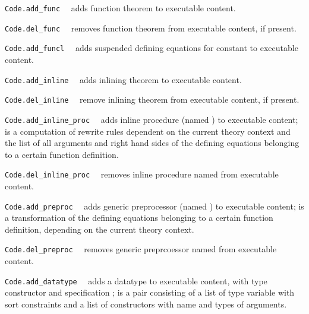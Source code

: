\begin{isabellebody}
\begin{isamarkuptext}
  \begin{description}

  \item \verb|Code.add_func|~~ adds function
     theorem  to executable content.

  \item \verb|Code.del_func|~~ removes function
     theorem  from executable content, if present.

  \item \verb|Code.add_funcl|~~ adds
     suspended defining equations  for constant
      to executable content.

  \item \verb|Code.add_inline|~~ adds
     inlining theorem  to executable content.

  \item \verb|Code.del_inline|~~ remove
     inlining theorem  from executable content, if present.

  \item \verb|Code.add_inline_proc|~~ adds
     inline procedure  (named ) to executable content;
      is a computation of rewrite rules dependent on
     the current theory context and the list of all arguments
     and right hand sides of the defining equations belonging
     to a certain function definition.

  \item \verb|Code.del_inline_proc|~~ removes
     inline procedure named  from executable content.

  \item \verb|Code.add_preproc|~~ adds
     generic preprocessor  (named ) to executable content;
      is a transformation of the defining equations belonging
     to a certain function definition, depending on the
     current theory context.

  \item \verb|Code.del_preproc|~~ removes
     generic preprcoessor named  from executable content.

  \item \verb|Code.add_datatype|~~ adds
     a datatype to executable content, with type constructor
      and specification ;  is
     a pair consisting of a list of type variable with sort
     constraints and a list of constructors with name
     and types of arguments.


\end{description}
\end{isamarkuptext}
\end{isabellebody}
